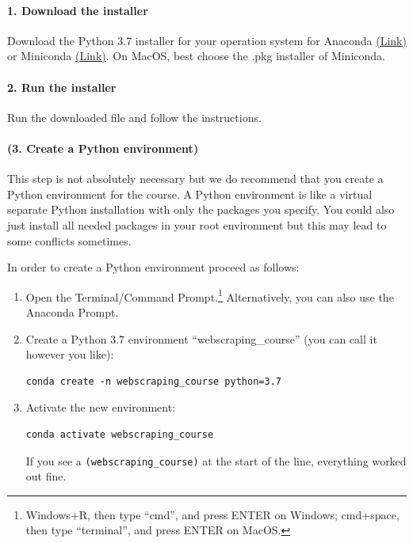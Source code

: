 \documentclass[a4paper]{article}
\begin{document}
\paragraph{1. Download the installer} Download the Python 3.7 installer for your operation system for Anaconda \href{https://www.anaconda.com/distribution/}{(Link)} or Miniconda \href{https://docs.conda.io/en/latest/miniconda.html}{(Link)}. On MacOS, best choose the .pkg installer of Miniconda.

\paragraph{2. Run the installer} Run the downloaded file and follow the instructions.

\paragraph{(3. Create a Python environment)} This step is not absolutely necessary but we do recommend that you create a Python environment for the course. A Python environment is like a virtual separate Python installation with only the packages you specify. You could also just install all needed packages in your root environment but this may lead to some conflicts sometimes.

\clearpage{}

In order to create a Python environment proceed as follows:
\begin{enumerate}
	\item Open the Terminal/Command Prompt.\footnote{Windows+R, then type ``cmd'', and press ENTER on Windows; cmd+space, then type ``terminal'', and press ENTER on MacOS.} Alternatively, you can also use the Anaconda Prompt.
	\item Create a Python 3.7 environment ``webscraping\_course'' (you can call it however you like):
\begin{verbatim}
conda create -n webscraping_course python=3.7
\end{verbatim}
	\item Activate the new environment:
\begin{verbatim}
conda activate webscraping_course
\end{verbatim}
	If you see a \texttt{(webscraping_course)} at the start of the line, everything worked out fine.
\end{enumerate}
\end{document}

